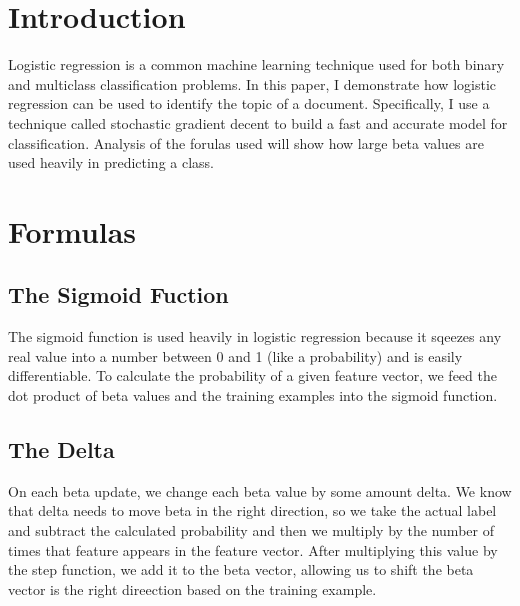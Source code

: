 \documentclass{article}
\begin{document}
 


\section{Introduction}
Logistic regression is a common machine learning technique used for both binary and multiclass classification problems. In this paper, I demonstrate how logistic regression can be used to identify the topic of a document. Specifically, I use a technique called stochastic gradient decent to build a fast and accurate model for classification. Analysis of the forulas used will show how large beta values are used heavily in predicting a class.

\section{Formulas}

\subsection{The Sigmoid Fuction}
The sigmoid function is used heavily in logistic regression because it sqeezes any real value into a number between 0 and 1 (like a probability) and is easily differentiable. To calculate the probability of a given feature vector, we feed the dot product of beta values and the training examples into the sigmoid function.

\subsection{The Delta}
On each beta update, we change each beta value by some amount delta. We know that delta needs to move beta in the right direction, so we take the actual label and subtract the calculated probability and then we multiply by the number of times that feature appears in the feature vector. After multiplying this value by the step function, we add it to the beta vector, allowing us to shift the beta vector is the right direection based on the training example.
\end{document}
